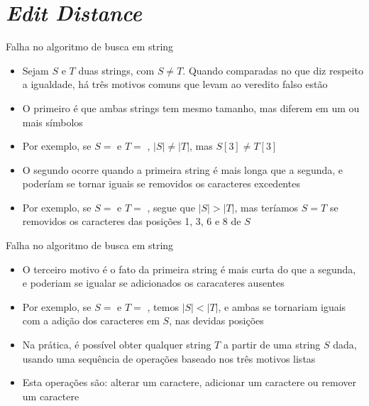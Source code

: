 \section{\it Edit Distance}

\begin{frame}[fragile]{Falha no algoritmo de busca em string}

    \begin{itemize}
        \item  Sejam $S$ e $T$ duas strings, com $S \neq T$. Quando comparadas no que diz respeito
            a igualdade, há três motivos comuns que levam ao veredito falso estão

        \item O primeiro é que ambas strings tem mesmo tamanho, mas diferem em um ou mais símbolos

        \item Por exemplo, se $S = $  e $T = $ , 
            $|S|\neq |T|$, mas $S[3] \neq T[3]$

        \item O segundo ocorre quando a primeira string é mais longa que a segunda, e poderíam se 
            tornar iguais se removidos os caracteres excedentes

        \item Por exemplo, se $S = $  e $T = $ , segue que
            $|S| > |T|$, mas teríamos $S = T$ se removidos os caracteres das posições 
            1, 3, 6 e 8 de $S$
    \end{itemize}

\end{frame}

\begin{frame}[fragile]{Falha no algoritmo de busca em string}

    \begin{itemize}
        \item O terceiro motivo é o fato da primeira string é mais curta do que a segunda, e 
            poderiam se igualar se adicionados os caracateres ausentes

        \item Por exemplo, se $S = $  e $T = $ , temos
            $|S| < |T|$, e ambas se tornariam iguais com a adição dos caracteres 
                 em $S$, nas devidas posições

        \item Na prática, é possível obter qualquer string $T$ a partir de uma string $S$ dada, 
            usando uma sequência de operações baseado nos três motivos listas

        \item Esta operações são: alterar um caractere, adicionar um caractere ou remover um caractere
    \end{itemize}

\end{frame}

